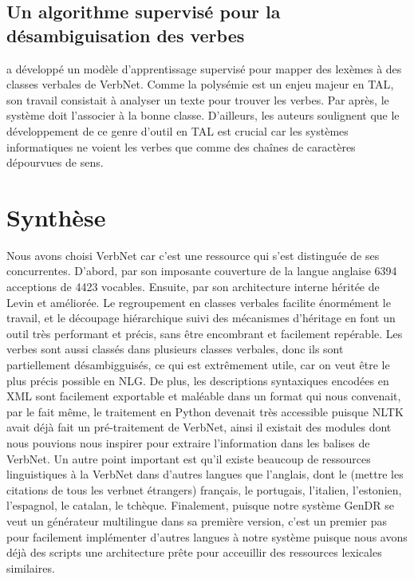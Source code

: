 \subsection{Un algorithme supervisé pour la désambiguisation des verbes}
\cite{AbendSupervisedAlgorithmVerb2008} a développé un modèle d'apprentissage supervisé pour mapper des lexèmes à des classes verbales de VerbNet. Comme la polysémie est un enjeu majeur en \ac{TAL}, son travail consistait à analyser un texte pour trouver les verbes. Par après, le système doit l'associer à la bonne classe. D'ailleurs, les auteurs soulignent que le développement de ce genre d'outil en \ac{TAL} est crucial car les systèmes informatiques ne voient les verbes que comme des chaînes de caractères dépourvues de sens.


\section{Synthèse}

Nous avons choisi VerbNet car c'est une ressource qui s'est distinguée de ses concurrentes. D'abord, par son imposante couverture de la langue anglaise 6394 acceptions de 4423 vocables. Ensuite, par son architecture interne héritée de Levin et améliorée. Le regroupement en classes verbales facilite énormément le travail, et le découpage hiérarchique suivi des mécanismes d'héritage en font un outil très performant et précis, sans être encombrant et facilement repérable. Les verbes sont aussi classés dans plusieurs classes verbales, donc ils sont partiellement désambigguisés, ce qui est extrêmement utile, car on veut être le plus précis possible en NLG. De plus, les descriptions syntaxiques encodées en XML sont facilement exportable et maléable dans un format qui nous convenait, par le fait même, le traitement en Python devenait très accessible puisque NLTK avait déjà fait un pré-traitement de VerbNet, ainsi il existait des modules dont nous pouvions nous inspirer pour extraire l'information dans les balises de VerbNet. Un autre point important est qu'il existe beaucoup de ressources linguistiques à la VerbNet dans d'autres langues que l'anglais, dont le (mettre les citations de tous les verbnet étrangers) français, le portugais, l'italien, l'estonien, l'espagnol, le catalan, le tchèque. Finalement, puisque notre système GenDR se veut un générateur multilingue dans sa première version, c'est un premier pas pour facilement implémenter d'autres langues à notre système puisque nous avons déjà des scripts une architecture prête pour acceuillir des ressources lexicales similaires. 

